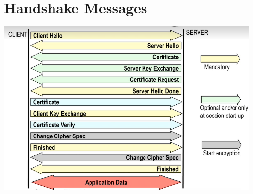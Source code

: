 \documentclass{book}
\theoremstyle{remark}
\begin{document}
\section{Handshake Messages}
\begin{center}
	\includegraphics[scale=0.6]{2021-11-22-14-56-02.png}
\end{center}
\end{document}

